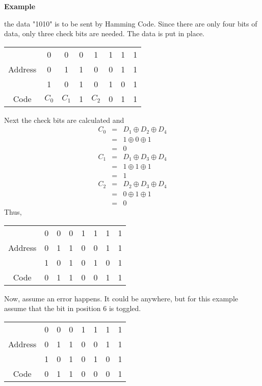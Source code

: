 \textbf{Example}

the data "1010" is to be sent by Hamming Code.  Since there are only four bits of data, only three check bits are needed.  The data is put in place.

\begin{tabular}{|c|c|c|c|c|c|c|c|}
\hline
        & 0     & 0     & 0 & 1     & 1 & 1 & 1 \\
Address & 0     & 1     & 1 & 0     & 0 & 1 & 1 \\
        & 1     & 0     & 1 & 0     & 1 & 0 & 1 \\ \hline
Code    & $C_0$ & $C_1$ & 1 & $C_2$ & 0 & 1 & 1 \\ \hline
\end{tabular}

Next the check bits are calculated and
\begin{eqnarray*}
  C_0 &=& D_1 \oplus D_2 \oplus D_4 \\
      &=& 1 \oplus 0 \oplus 1 \\
      &=& 0 \\
  C_1 &=& D_1 \oplus D_3 \oplus D_4 \\
      &=& 1 \oplus 1 \oplus 1 \\
      &=& 1 \\
  C_2 &=& D_2 \oplus D_3 \oplus D_4 \\
      &=& 0 \oplus 1 \oplus 1 \\
      &=& 0
\end{eqnarray*}
Thus,

\begin{tabular}{|c|c|c|c|c|c|c|c|}
\hline
        & 0 & 0 & 0 & 1 & 1 & 1 & 1 \\
Address & 0 & 1 & 1 & 0 & 0 & 1 & 1 \\
        & 1 & 0 & 1 & 0 & 1 & 0 & 1 \\ \hline
Code    & 0 & 1 & 1 & 0 & 0 & 1 & 1 \\ \hline
\end{tabular}

Now, assume an error happens.  It could be anywhere, but for this example assume that the bit in position 6 is toggled.

\begin{tabular}{|c|c|c|c|c|c|c|c|}
\hline
        & 0 & 0 & 0 & 1 & 1 & 1 & 1 \\
Address & 0 & 1 & 1 & 0 & 0 & 1 & 1 \\
        & 1 & 0 & 1 & 0 & 1 & 0 & 1 \\ \hline
Code    & 0 & 1 & 1 & 0 & 0 & 0 & 1 \\ \hline
\end{tabular}

